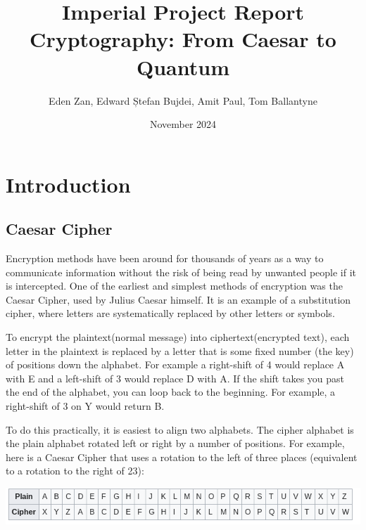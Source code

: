 \documentclass{article}
\title{Imperial Project Report \\ 
Cryptography: From Caesar to Quantum}
\author{Eden Zan, Edward Ștefan Bujdei, Amit Paul, Tom Ballantyne}
\date{November 2024}
\begin{document}
\maketitle

\tableofcontents

\section{Introduction}

\subsection{Caesar Cipher}
Encryption methods have been around for thousands of years as a way to communicate information without the risk of being read by unwanted people if it is intercepted. One of the earliest and simplest methods of encryption was the Caesar Cipher, used by Julius Caesar himself. It is an example of a substitution cipher, where letters are systematically replaced by other letters or symbols.\medskip

To encrypt the plaintext(normal message) into ciphertext(encrypted text), each letter in the plaintext is replaced by a letter that is some fixed number (the key) of positions down the alphabet. For example a right-shift of 4 would replace A with E and a left-shift of 3 would replace D with A. If the shift takes you past the end of the alphabet, you can loop back to the beginning. For example, a right-shift of 3 on Y would return B.
\medskip

To do this practically, it is easiest to align two alphabets. The cipher alphabet is the plain alphabet rotated left or right by a number of positions. For example, here is a Caesar Cipher that uses a rotation to the left of three places (equivalent to a rotation to the right of 23):
\medskip

\includegraphics[width = \textwidth]{Screenshot 2024-11-24 22.13.38.png}
\medskip
\end{document}
